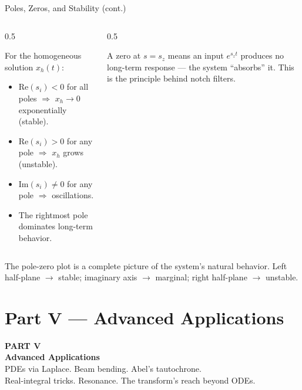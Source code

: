 \documentclass[aspectratio=169,11pt]{beamer}
\begin{document}
\begin{frame}{Poles, Zeros, and Stability (cont.)}
\footnotesize
\begin{columns}[T]
\begin{column}{0.5\textwidth}
\begin{formulabox}
For the homogeneous solution $x_h(t)$:
\begin{itemize}
\item $\mathrm{Re}(s_i) < 0$ for all poles $\Rightarrow$ $x_h \to 0$ exponentially (stable).
\item $\mathrm{Re}(s_i) > 0$ for any pole $\Rightarrow$ $x_h$ grows (unstable).
\item $\mathrm{Im}(s_i) \ne 0$ for any pole $\Rightarrow$ oscillations.
\item The rightmost pole dominates long-term behavior.
\end{itemize}
\end{formulabox}
\end{column}
\begin{column}{0.5\textwidth}
\begin{warningbox}
A zero at $s = s_z$ means an input $e^{s_z t}$ produces no long-term response --- the system ``absorbs'' it. This is the principle behind notch filters.
\end{warningbox}
\end{column}
\end{columns}
\vspace{0.5mm}
\begin{conceptbox}
The pole-zero plot is a complete picture of the system's natural behavior. Left half-plane $\to$ stable; imaginary axis $\to$ marginal; right half-plane $\to$ unstable.
\end{conceptbox}
\end{frame}


\section{Part V --- Advanced Applications}

{
\begin{frame}[plain]
\vspace{2cm}
{\color{accentorange}\Huge\textbf{PART V}}\\[0.4cm]
{\color{white}\Huge\textbf{Advanced Applications}}\\[0.8cm]
{\color{white!85}\large PDEs via Laplace. Beam bending. Abel's tautochrone.\\
Real-integral tricks. Resonance. The transform's reach beyond ODEs.}
\end{frame}
}
\end{document}
